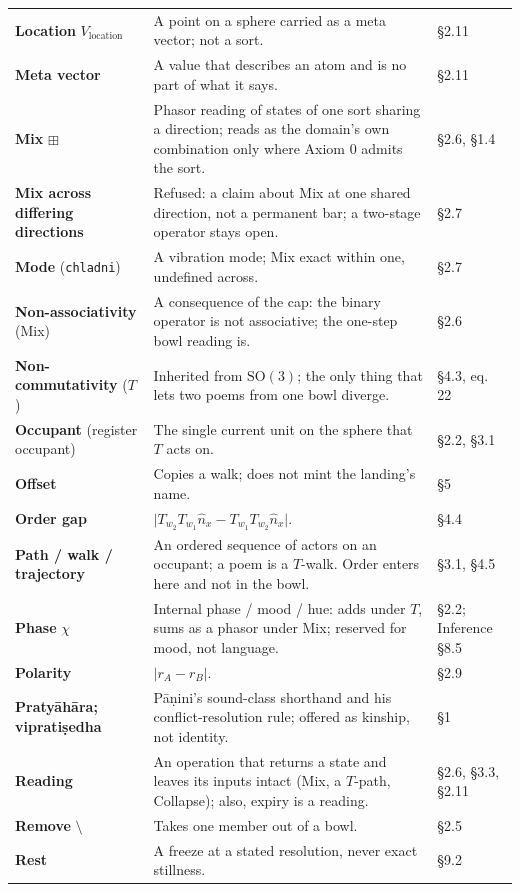 \documentclass[10.5pt]{article}
\begin{document}
{\begin{longtable}{L{3.6cm}L{10.9cm}L{1.8cm}}
\textbf{Location} $V_{\text{location}}$ & A point on a sphere carried as a meta vector; not a sort. & §2.11 \\
\textbf{Meta vector} & A value that describes an atom and is no part of what it says. & §2.11 \\
\textbf{Mix} $\boxplus$ & Phasor reading of states of one sort sharing a direction; reads as the domain's own combination only where Axiom 0 admits the sort. & §2.6, §1.4 \\
\textbf{Mix across differing directions} & Refused: a claim about Mix at one shared direction, not a permanent bar; a two-stage operator stays open. & §2.7 \\
\textbf{Mode} (\texttt{chladni}) & A vibration mode; Mix exact within one, undefined across. & §2.7 \\
\textbf{Non-associativity} (Mix) & A consequence of the cap: the binary operator is not associative; the one-step bowl reading is. & §2.6 \\
\textbf{Non-commutativity} ($T$) & Inherited from $\mathrm{SO}(3)$; the only thing that lets two poems from one bowl diverge. & §4.3, eq. 22 \\
\textbf{Occupant} (register occupant) & The single current unit on the sphere that $T$ acts on. & §2.2, §3.1 \\
\textbf{Offset} & Copies a walk; does not mint the landing's name. & §5 \\
\textbf{Order gap} & $\lvert T_{w_2}T_{w_1}\hat n_x-T_{w_1}T_{w_2}\hat n_x\rvert$. & §4.4 \\
\textbf{Path / walk / trajectory} & An ordered sequence of actors on an occupant; a poem is a $T$-walk. Order enters here and not in the bowl. & §3.1, §4.5 \\
\textbf{Phase} $\chi$ & Internal phase / mood / hue: adds under $T$, sums as a phasor under Mix; reserved for mood, not language. & §2.2; Inference §8.5 \\
\textbf{Polarity} & $\lvert r_A-r_B\rvert$. & §2.9 \\
\textbf{Pratyāhāra; vipratiṣedha} & Pāṇini's sound-class shorthand and his conflict-resolution rule; offered as kinship, not identity. & §1 \\
\textbf{Reading} & An operation that returns a state and leaves its inputs intact (Mix, a $T$-path, Collapse); also, expiry is a reading. & §2.6, §3.3, §2.11 \\
\textbf{Remove} $\setminus$ & Takes one member out of a bowl. & §2.5 \\
\textbf{Rest} & A freeze at a stated resolution, never exact stillness. & §9.2 \\

\end{longtable}}
\end{document}
